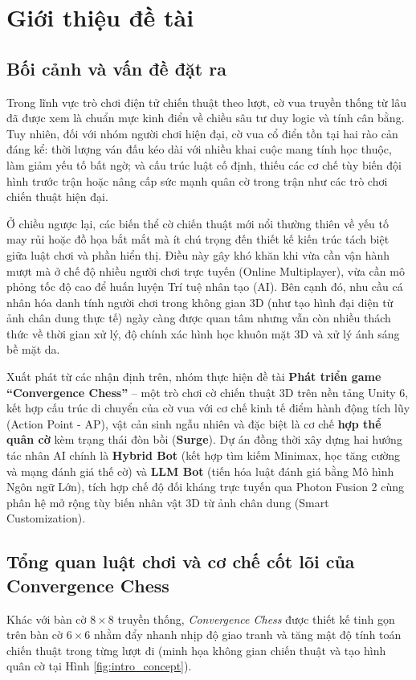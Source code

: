 \section{Giới thiệu đề tài}

\subsection{Bối cảnh và vấn đề đặt ra}
Trong lĩnh vực trò chơi điện tử chiến thuật theo lượt, cờ vua truyền thống từ lâu đã được xem là chuẩn mực kinh điển về chiều sâu tư duy logic và tính cân bằng. Tuy nhiên, đối với nhóm người chơi hiện đại, cờ vua cổ điển tồn tại hai rào cản đáng kể: thời lượng ván đấu kéo dài với nhiều khai cuộc mang tính học thuộc, làm giảm yếu tố bất ngờ; và cấu trúc luật cố định, thiếu các cơ chế tùy biến đội hình trước trận hoặc nâng cấp sức mạnh quân cờ trong trận như các trò chơi chiến thuật hiện đại.

Ở chiều ngược lại, các biến thể cờ chiến thuật mới nổi thường thiên về yếu tố may rủi hoặc đồ họa bắt mắt mà ít chú trọng đến thiết kế kiến trúc tách biệt giữa luật chơi và phần hiển thị. Điều này gây khó khăn khi vừa cần vận hành mượt mà ở chế độ nhiều người chơi trực tuyến (Online Multiplayer), vừa cần mô phỏng tốc độ cao để huấn luyện Trí tuệ nhân tạo (AI). Bên cạnh đó, nhu cầu cá nhân hóa danh tính người chơi trong không gian 3D (như tạo hình đại diện từ ảnh chân dung thực tế) ngày càng được quan tâm nhưng vẫn còn nhiều thách thức về thời gian xử lý, độ chính xác hình học khuôn mặt 3D và xử lý ánh sáng bề mặt da.

Xuất phát từ các nhận định trên, nhóm thực hiện đề tài \textbf{Phát triển game ``Convergence Chess''} -- một trò chơi cờ chiến thuật 3D trên nền tảng Unity 6, kết hợp cấu trúc di chuyển của cờ vua với cơ chế kinh tế điểm hành động tích lũy (Action Point - AP), vật cản sinh ngẫu nhiên và đặc biệt là cơ chế \textbf{hợp thể quân cờ} kèm trạng thái đòn bồi (\textbf{Surge}). Dự án đồng thời xây dựng hai hướng tác nhân AI chính là \textbf{Hybrid Bot} (kết hợp tìm kiếm Minimax, học tăng cường và mạng đánh giá thế cờ) và \textbf{LLM Bot} (tiến hóa luật đánh giá bằng Mô hình Ngôn ngữ Lớn), tích hợp chế độ đối kháng trực tuyến qua Photon Fusion 2 cùng phân hệ mở rộng tùy biến nhân vật 3D từ ảnh chân dung (Smart Customization).

\subsection{Tổng quan luật chơi và cơ chế cốt lõi của Convergence Chess}
Khác với bàn cờ $8 \times 8$ truyền thống, \textit{Convergence Chess} được thiết kế tinh gọn trên bàn cờ $6 \times 6$ nhằm đẩy nhanh nhịp độ giao tranh và tăng mật độ tính toán chiến thuật trong từng lượt đi (minh họa không gian chiến thuật và tạo hình quân cờ tại Hình \ref{fig:intro_concept}).

